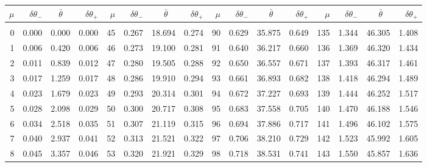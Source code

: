 \clearpage
\begin{table}[!h]\centering
\vspace{0.25cm}
\scriptsize{ \begin{tabular}{rrrr|rrrr|rrrr|rrrr}
$\mu$ & $\delta\theta_-$  & $\bar{\theta}~~~~$ & $\delta\theta_+$ &
$\mu$ & $\delta\theta_-$  & $\bar{\theta}~~~~$ & $\delta\theta_+$ &
$\mu$ & $\delta\theta_-$  & $\bar{\theta}~~~~$ & $\delta\theta_+$ &
$\mu$ & $\delta\theta_-$  & $\bar{\theta}~~~~$ & $\delta\theta_+$ \\\hline
&&&&&&&&&&&&&&&\\[-1.75ex]
  0 & \tiny{  0.000} &   0.000 & \tiny{  0.000} &  45 & \tiny{  0.267} &  18.694 & \tiny{  0.274} &  90 & \tiny{  0.629} &  35.875 & \tiny{  0.649} & 135 & \tiny{  1.344} &  46.305 & \tiny{  1.408}\\
  1 & \tiny{  0.006} &   0.420 & \tiny{  0.006} &  46 & \tiny{  0.273} &  19.100 & \tiny{  0.281} &  91 & \tiny{  0.640} &  36.217 & \tiny{  0.660} & 136 & \tiny{  1.369} &  46.320 & \tiny{  1.434}\\
  2 & \tiny{  0.011} &   0.839 & \tiny{  0.012} &  47 & \tiny{  0.280} &  19.505 & \tiny{  0.288} &  92 & \tiny{  0.650} &  36.557 & \tiny{  0.671} & 137 & \tiny{  1.393} &  46.317 & \tiny{  1.461}\\
  3 & \tiny{  0.017} &   1.259 & \tiny{  0.017} &  48 & \tiny{  0.286} &  19.910 & \tiny{  0.294} &  93 & \tiny{  0.661} &  36.893 & \tiny{  0.682} & 138 & \tiny{  1.418} &  46.294 & \tiny{  1.489}\\
  4 & \tiny{  0.023} &   1.679 & \tiny{  0.023} &  49 & \tiny{  0.293} &  20.314 & \tiny{  0.301} &  94 & \tiny{  0.672} &  37.227 & \tiny{  0.693} & 139 & \tiny{  1.444} &  46.252 & \tiny{  1.517}\\
  5 & \tiny{  0.028} &   2.098 & \tiny{  0.029} &  50 & \tiny{  0.300} &  20.717 & \tiny{  0.308} &  95 & \tiny{  0.683} &  37.558 & \tiny{  0.705} & 140 & \tiny{  1.470} &  46.188 & \tiny{  1.546}\\
  6 & \tiny{  0.034} &   2.518 & \tiny{  0.035} &  51 & \tiny{  0.307} &  21.119 & \tiny{  0.315} &  96 & \tiny{  0.694} &  37.886 & \tiny{  0.717} & 141 & \tiny{  1.496} &  46.102 & \tiny{  1.575}\\
  7 & \tiny{  0.040} &   2.937 & \tiny{  0.041} &  52 & \tiny{  0.313} &  21.521 & \tiny{  0.322} &  97 & \tiny{  0.706} &  38.210 & \tiny{  0.729} & 142 & \tiny{  1.523} &  45.992 & \tiny{  1.605}\\
  8 & \tiny{  0.045} &   3.357 & \tiny{  0.046} &  53 & \tiny{  0.320} &  21.921 & \tiny{  0.329} &  98 & \tiny{  0.718} &  38.531 & \tiny{  0.741} & 143 & \tiny{  1.550} &  45.857 & \tiny{  1.636}\\

\end{tabular}}
\end{table}
